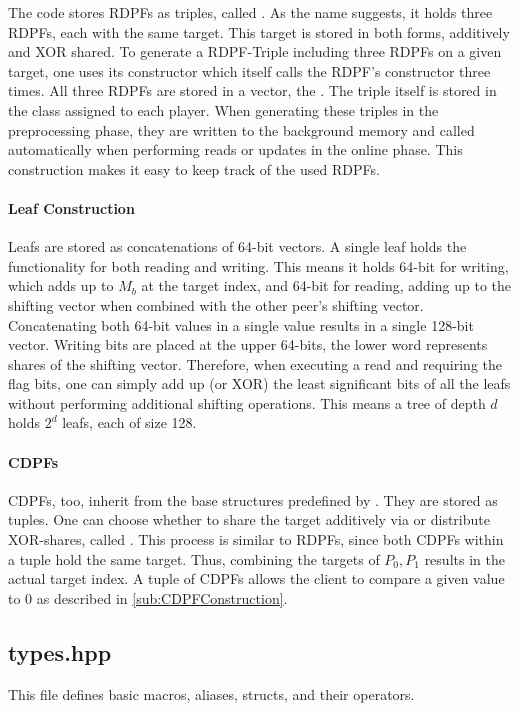 The code stores RDPFs as triples, called .
As the name suggests, it holds three RDPFs, each with the same target.
This target is stored in both forms, additively and XOR shared.
To generate a RDPF-Triple including three RDPFs on a given target, one uses its constructor which itself calls the RDPF's constructor three times.
All three RDPFs are stored in a vector, the .
The triple itself is stored in the  class assigned to each player.
When generating these triples in the preprocessing phase, they are written to the background memory and called automatically when performing reads or updates in the online phase.
This construction makes it easy to keep track of the used RDPFs.

\paragraph*{Leaf Construction}\label{par:leafConstruction}
Leafs are stored as concatenations of 64-bit vectors.
A single leaf holds the functionality for both reading and writing.
This means it holds 64-bit for writing, which adds up to $M_b$ at the target index, and 64-bit for reading, adding up to the shifting vector when combined with the other peer's shifting vector.
Concatenating both 64-bit values in a single value results in a single 128-bit vector.
Writing bits are placed at the upper 64-bits, the lower word represents shares of the shifting vector.
Therefore, when executing a read and requiring the flag bits, one can simply add up (or XOR) the least significant bits of all the leafs without performing additional shifting operations.
This means a tree of depth $d$ holds $2^d$ leafs, each of size 128.

\paragraph{CDPFs}\label{par:preliminariesCDPFs}
CDPFs, too, inherit from the base structures predefined by .
They are stored as tuples.
One can choose whether to share the target additively via  or distribute XOR-shares, called .
This process is similar to RDPFs, since both CDPFs within a tuple hold the same target.
Thus, combining the targets of $P_0,P_1$ results in the actual target index.
A tuple of CDPFs allows the client to compare a given value to $0$ as described in \ref{sub:CDPFConstruction}.

\subsection*{types.hpp} \label{subsub:implementationTypeshpp}
This file defines basic macros, aliases, structs, and their operators.


